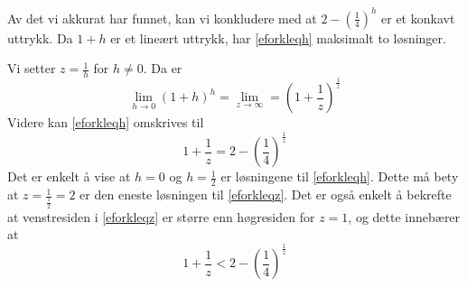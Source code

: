 Av det vi akkurat har funnet, kan vi konkludere med at $2-\left(\frac{1}{4}\right)^h $ er et konkavt uttrykk. Da $ 1+h$ er et lineært uttrykk, har \eqref{eforkleqh} maksimalt to løsninger.

Vi setter $z=\frac{1}{h} $ for $ h\neq0 $. Da er
\[ \lim\limits_{h\to 0} (1+h)^h=\lim\limits_{z\to\infty}=\left(1+\frac{1}{z}\right)^\frac{1}{z} \]
Videre kan \eqref{eforkleqh} omskrives til
\begin{equation}\label{eforkleqz}
	1+\frac{1}{z}=2-\left(\frac{1}{4}\right)^\frac{1}{z}
\end{equation}
Det er enkelt å vise at $ h=0 $ og $ h=\frac{1}{2} $ er løsningene til \eqref{eforkleqh}. Dette må bety at $ z=\frac{1}{\frac{1}{2}}=2 $ er den eneste løsningen til \eqref{eforkleqz}. Det er også enkelt å bekrefte at venstresiden i \eqref{eforkleqz} er større enn høgresiden for $ z=1 $, og dette innebærer at
\[ 1+\frac{1}{z}<2-\left(\frac{1}{4}\right)^\frac{1}{z} \]
